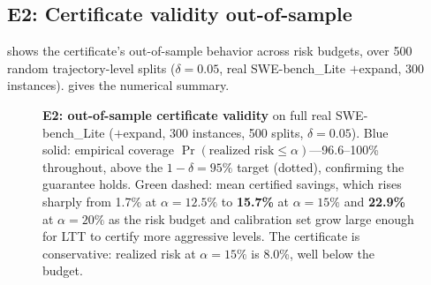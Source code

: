 \documentclass{article}
\begin{document}
\subsection{E2: Certificate validity out-of-sample}
\label{sec:e2}

 shows the certificate's out-of-sample behavior across
risk budgets, over 500 random trajectory-level splits ($\delta=0.05$, real
SWE-bench\_Lite $+$expand, 300 instances).  gives the numerical
summary.

\begin{figure}[t]
\centering
{}
\caption{\textbf{E2: out-of-sample certificate validity} on full real SWE-bench\_Lite
($+$expand, 300 instances, 500 splits, $\delta=0.05$). Blue solid: empirical coverage
$\Pr(\text{realized risk}\le\alpha)$---96.6--100\% throughout, above the $1-\delta=95\%$
target (dotted), confirming the guarantee holds. Green dashed: mean certified savings,
which rises sharply from 1.7\% at $\alpha=12.5\%$ to \textbf{15.7\%} at $\alpha=15\%$
and \textbf{22.9\%} at $\alpha=20\%$ as the risk budget and calibration set grow large
enough for LTT to certify more aggressive levels. The certificate is conservative:
realized risk at $\alpha=15\%$ is 8.0\%, well below the budget.}
\label{fig:alpha_tradeoff}
\end{figure}
\end{document}
